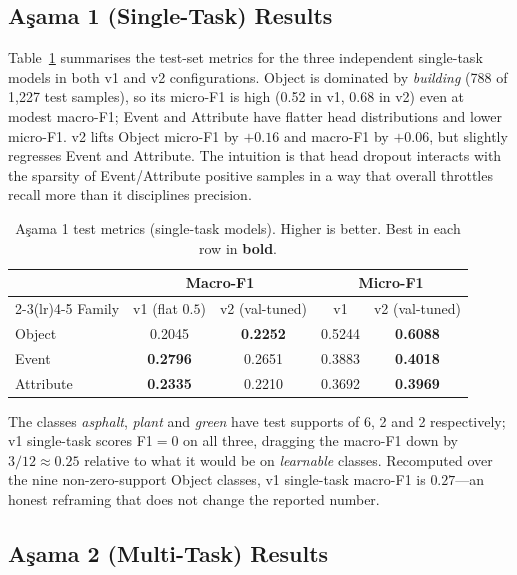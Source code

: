 \documentclass[journal]{IEEEtran}
\begin{document}
\subsection{A\c{s}ama 1 (Single-Task) Results}\label{ssec:results-stage1}

Table~\ref{tab:single-task} summarises the test-set metrics for the three independent single-task models in both v1 and v2 configurations. Object is dominated by \emph{building} (788 of 1{,}227 test samples), so its micro-F1 is high (0.52 in v1, 0.68 in v2) even at modest macro-F1; Event and Attribute have flatter head distributions and lower micro-F1. v2 lifts Object micro-F1 by $+0.16$ and macro-F1 by $+0.06$, but slightly regresses Event and Attribute. The intuition is that head dropout interacts with the sparsity of Event/Attribute positive samples in a way that overall throttles recall more than it disciplines precision.

\begin{table}[!t]
\caption{A\c{s}ama 1 test metrics (single-task models). Higher is better. Best in each row in \textbf{bold}.}
\label{tab:single-task}
\centering
\small
\begin{tabular}{@{}lcccc@{}}
\toprule
 & \multicolumn{2}{c}{Macro-F1} & \multicolumn{2}{c}{Micro-F1} \\
\cmidrule(lr){2-3}\cmidrule(lr){4-5}
Family & v1 (flat $0.5$) & v2 (val-tuned) & v1 & v2 (val-tuned) \\
\midrule
Object     & 0.2045 & \textbf{0.2252} & 0.5244 & \textbf{0.6088} \\
Event      & \textbf{0.2796} & 0.2651 & 0.3883 & \textbf{0.4018} \\
Attribute  & \textbf{0.2335} & 0.2210 & 0.3692 & \textbf{0.3969} \\
\bottomrule
\end{tabular}
\end{table}

The classes \emph{asphalt}, \emph{plant} and \emph{green} have test supports of 6, 2 and 2 respectively; v1 single-task scores F1$=0$ on all three, dragging the macro-F1 down by $3/12 \approx 0.25$ relative to what it would be on \emph{learnable} classes. Recomputed over the nine non-zero-support Object classes, v1 single-task macro-F1 is $0.27$---an honest reframing that does not change the reported number.

\subsection{A\c{s}ama 2 (Multi-Task) Results}\label{ssec:results-stage2}
\end{document}
